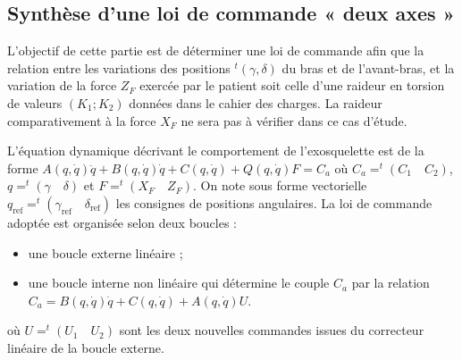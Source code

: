 \begin{multicols}{2}
\ifprof
\begin{corrige}
\end{corrige}
\else
\fi


\ifprof
\begin{corrige}
\end{corrige}
\else
\fi


\ifprof
\begin{corrige}
\end{corrige}
\else
\fi



\subsection*{Synthèse d’une loi de commande « deux axes »}

\begin{obj}
L’objectif de cette partie est de déterminer une loi de commande afin que la relation entre les variations
des positions $ ^t\left(\gamma,\delta\right)$ du bras et de l’avant-bras, et la variation de la force $Z_F$ exercée par le patient soit celle d’une raideur en torsion de valeurs $(K_1;K_2)$ données dans le cahier des charges. La raideur comparativement à la force $X_F$ ne sera pas à vérifier dans ce cas d’étude.
\end{obj}


L’équation dynamique décrivant le comportement de l’exosquelette est de la forme 
$A(q, \dot{q})\ddot{q}+ B(q, \dot{q})\dot{q} + C(q, \dot{q}) + Q(q, \dot{q}) F = C_a$ 
où $C_a = ^t(C_1\quad C_2)$, $q = ^t(\gamma \quad \delta)$ et $F = ^t(X_F \quad Z_F )$. On note sous forme vectorielle $q_{\text{ref}} = ^t(\gamma_{\text{ref}} \quad \delta_{\text{ref}})$ les consignes
de positions angulaires. La loi de commande adoptée est organisée selon deux boucles :
\begin{itemize}
\item une boucle externe linéaire ;
\item une boucle interne non linéaire qui détermine le couple $C_a$ par la relation
$C_a = B(q, \dot{q})\dot{q} + C(q, \dot{q}) + A(q, \dot{q}) U$.
\end{itemize}
où $U = ^t(U_1 \quad U_2)$ sont les deux nouvelles commandes issues du correcteur linéaire de la boucle externe.


\end{multicols}

